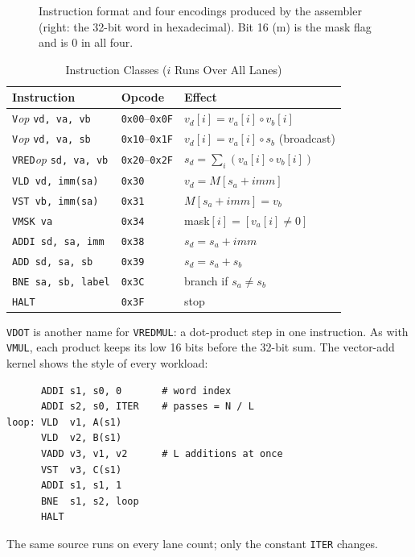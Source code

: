 \begin{figure}[t]
\centering

\caption{Instruction format and four encodings produced by the assembler (right: the
32-bit word in hexadecimal). Bit 16 (m) is the mask flag and is 0 in all four.}
\label{fig:format}
\end{figure}

\begin{table}[t]
\centering
\caption{Instruction Classes ($i$ Runs Over All Lanes)}
\label{tab:isa}
\footnotesize
\setlength{\tabcolsep}{3.5pt}
\begin{tabular}{lll}
\toprule
Instruction & Opcode & Effect \\
\midrule
\texttt{V}\emph{op} \texttt{vd, va, vb} & \texttt{0x00}--\texttt{0x0F} & $v_d[i] = v_a[i] \circ v_b[i]$ \\
\texttt{V}\emph{op} \texttt{vd, va, sb} & \texttt{0x10}--\texttt{0x1F} & $v_d[i] = v_a[i] \circ s_b$ (broadcast) \\
\texttt{VRED}\emph{op} \texttt{sd, va, vb} & \texttt{0x20}--\texttt{0x2F} & $s_d = \sum_i \left(v_a[i] \circ v_b[i]\right)$ \\
\texttt{VLD vd, imm(sa)}  & \texttt{0x30} & $v_d = M[s_a + \mathit{imm}]$ \\
\texttt{VST vb, imm(sa)}  & \texttt{0x31} & $M[s_a + \mathit{imm}] = v_b$ \\
\texttt{VMSK va}          & \texttt{0x34} & mask$[i] = [v_a[i] \neq 0]$ \\
\texttt{ADDI sd, sa, imm} & \texttt{0x38} & $s_d = s_a + \mathit{imm}$ \\
\texttt{ADD sd, sa, sb}   & \texttt{0x39} & $s_d = s_a + s_b$ \\
\texttt{BNE sa, sb, label}& \texttt{0x3C} & branch if $s_a \neq s_b$ \\
\texttt{HALT}             & \texttt{0x3F} & stop \\
\bottomrule
\end{tabular}
\end{table}

\texttt{VDOT} is another name for \texttt{VREDMUL}: a dot-product step in one
instruction. As with \texttt{VMUL}, each product keeps its low 16 bits before the
32-bit sum. The vector-add kernel shows the style of every workload:
\begin{lstlisting}
      ADDI s1, s0, 0       # word index
      ADDI s2, s0, ITER    # passes = N / L
loop: VLD  v1, A(s1)
      VLD  v2, B(s1)
      VADD v3, v1, v2      # L additions at once
      VST  v3, C(s1)
      ADDI s1, s1, 1
      BNE  s1, s2, loop
      HALT
\end{lstlisting}
The same source runs on every lane count; only the constant \texttt{ITER} changes.

